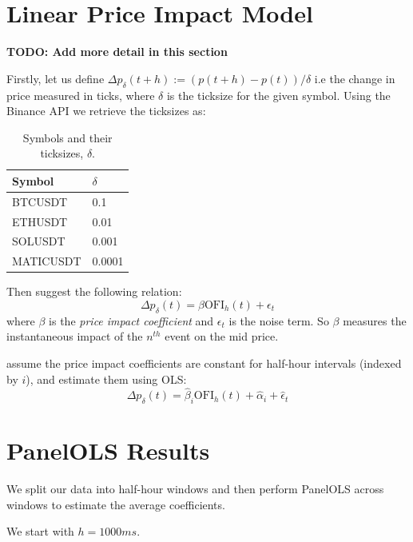 \documentclass[a4paper, oneside, notitlepage]{book}
\begin{document}
\section{Linear Price Impact Model}
\textbf{TODO: Add more detail in this section}

Firstly, let us define $\Delta p_{\delta}(t+h) := (p(t+h) - p(t)) / \delta$ i.e the change in price
measured in ticks, where $\delta$ is the ticksize for the given symbol. Using the Binance API we
retrieve the ticksizes as:  %
\begin{table}[ht]
    \centering
    \begin{tabular}{|l|l|}
        \hline
        \textbf{Symbol} & \textbf{$\delta$} \\
        \hline
        BTCUSDT & 0.1 \\
        \hline
        ETHUSDT & 0.01 \\
        \hline
        SOLUSDT & 0.001 \\
        \hline
        MATICUSDT & 0.0001 \\
        \hline
    \end{tabular}
    \caption{Symbols and their ticksizes, $\delta$.}
\end{table}


Then \cite{CONT2013} suggest the following relation:
\begin{equation}
    \Delta p_{\delta}(t) = \beta \text{OFI}_h(t) + \epsilon_t \label{linearrelation}
\end{equation}
where $\beta$ is the \textit{price impact coefficient} and $\epsilon_t$ is the noise
term. So $\beta$ measures the instantaneous impact of the $n^{th}$ event on the mid price. 

\cite{CONT2013} assume the price impact coefficients are constant for half-hour intervals (indexed by $i$),
and estimate them using OLS:
\begin{equation}
    \Delta p_{\delta}(t) = \hat{\beta}_i \text{OFI}_h(t) + \hat{\alpha}_i + \hat{\epsilon}_t
\end{equation}


\section{PanelOLS Results}
We split our data into half-hour windows and then perform PanelOLS across windows
to estimate the average coefficients.


We start with $h = 1000ms$.
\clearpage
\end{document}
